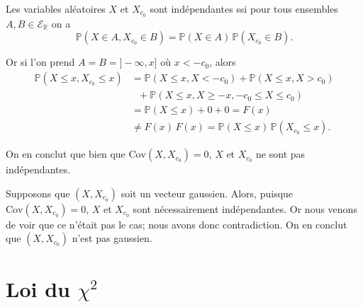 \label{II-answer-gausssym-indep}
Les variables aléatoires \(X\) et \(X_{c_0}\) sont indépendantes ssi
pour tous ensembles \(A,B \in \mathcal{E}_\mathbb{R}\) on a
\[\mathbb{P}\left(X \in A, X_{c_0} \in B \right) = \mathbb{P}\left(X \in A\right)\,\mathbb{P}\left(X_{c_0} \in B \right).\]

Or si l'on prend \(A = B = ]-\infty, x]\) où \(x < -c_0\), alors
\begin{align*}
\mathbb{P}\left( X \leq x, X_{c_0} \leq x \right) &= \mathbb{P}\left( X \leq x, X < -c_0 \right) + \mathbb{P}\left( X \leq x, X > c_0 \right)\\
&\ \ \ + \mathbb{P}\left( X\leq x, X \geq -x, -c_0 \leq X \leq c_0 \right)\\
&= \mathbb{P}\left( X \leq x \right) +0 + 0 = F(x)\\
& \neq F(x)\,F(x) = \mathbb{P}\left( X \leq x \right)\,\mathbb{P}\left(X_{c_0} \leq x \right).
\end{align*}

On en conclut que bien que \(\text{Cov}\left(X,X_{c_0}\right) = 0\),
\(X\) et \(X_{c_0}\) ne sont pas indépendantes.

\label{II-answer-gausssym-vecgauss}
Supposons que \((X,X_{c_0})\) soit un vecteur gaussien. Alors, puisque
\(\text{Cov}\left(X,X_{c_0}\right) = 0\), \(X\) et \(X_{c_0}\) sont
nécessairement indépendantes. Or nous venons de voir que ce n'était pas
le cas; nous avons donc contradiction. On en conclut que \((X,X_{c_0})\)
n'est pas gaussien.

\section{Loi du \(\chi^2\)}\label{II-loi-du-chi2-1}

\label{II-answer-khi2-1dl}

